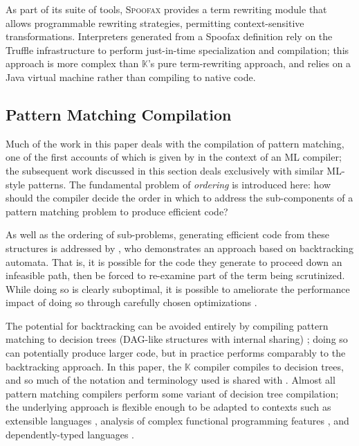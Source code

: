 \documentclass{article}
\theoremstyle{definition}
\newcommand{\K}{$\mathbb{K}$\xspace}
\begin{document}
As part of its suite of tools, \textsc{Spoofax} \cite{spoofax} provides a
term rewriting module that
allows programmable rewriting strategies, permitting context-sensitive transformations. 
Interpreters generated from a Spoofax definition rely on the Truffle
\cite{Wurthinger2017} infrastructure to perform just-in-time specialization and
compilation; this approach is more complex than \K's pure term-rewriting
approach, and relies on a Java virtual machine rather than compiling to native
code.


\subsection{Pattern Matching Compilation}

Much of the work in this paper deals with the compilation of pattern matching,
one of the first accounts of which is given by \citet{Cardelli1984} in the
context of an ML compiler; the subsequent work discussed in this section deals
exclusively with similar ML-style patterns. The fundamental problem of
\emph{ordering} is introduced here: how should the compiler decide the order in
which to address the sub-components of a pattern matching problem to produce
efficient code?

As well as the ordering of sub-problems, generating efficient code from these
structures is addressed by \citet{Augustsson1985}, who demonstrates an approach
based on backtracking automata. That is, it is possible for the code they
generate to proceed down an infeasible path, then be forced to re-examine part
of the term being scrutinized. While doing so is clearly suboptimal, it is
possible to ameliorate the performance impact of doing so through carefully
chosen optimizations \cite{LeFessant2001}.

The potential for backtracking can be avoided entirely by compiling pattern
matching to decision trees (DAG-like structures with internal sharing)
\cite{Maranget2008}; doing so can potentially produce larger code, but in
practice performs comparably to the backtracking approach. In this paper, the \K
compiler compiles to decision trees, and so much of the notation and terminology
used is shared with \citet{Maranget2008}. Almost all pattern matching compilers
perform some variant of decision tree compilation; the underlying approach is
flexible enough to be adapted to contexts such as extensible languages
\cite{Tobin-Hochstadt2011}, analysis of complex functional programming features
\cite{Karachalias2015}, and dependently-typed languages \cite{Cockx2016}.
\end{document}

